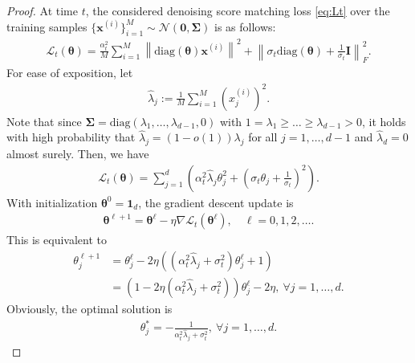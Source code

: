 \documentclass{article}
\theoremstyle{plain}
\theoremstyle{definition}
\theoremstyle{remark}
\begin{document}
\begin{proof}
    At time $t$, the considered denoising score matching loss \eqref{eq:Lt} over the training samples $\{\bm x^{(i)}\}_{i=1}^M \sim \mathcal{N}(\bm 0, \bm \Sigma)$ is as follows:
\begin{align*}
    \mathcal{L}_t(\bm \theta)
 = \frac{\alpha_t^2}{M}\sum_{i=1}^M\left\|\mathrm{diag}(\bm \theta)\bm x^{(i)}\right\|^2 + \left\|\sigma_t\mathrm{diag}(\bm \theta) + \frac{1}{\sigma_t}\bm{I} \right\|_F^2.
\end{align*}
For ease of exposition, let
\begin{align}
    \hat{\lambda}_j := \frac{1}{M}\sum_{i=1}^M \left( x_{j}^{(i)}\right)^2.
\end{align}
Note that since $\bm \Sigma = \mathrm{diag}(\lambda_1,\dots,\lambda_{d-1},0)$ with $1 = \lambda_1 \ge \dots \ge \lambda_{d-1} > 0$, it holds with high probability that $\hat{\lambda}_j = \left(1 - o(1)\right)\lambda_j$ for all $j=1,\dots,d-1$ and $\hat{\lambda}_d = 0$ almost surely.
Then, we have
\begin{align*}
      \mathcal{L}_t(\bm \theta) = \sum_{j=1}^d \left( \alpha_t^2 \hat{\lambda}_j \theta_j^2 + \left( \sigma_t  \theta_j + \frac{1}{\sigma_t} \right)^2 \right).
\end{align*}
With initialization $\bm \theta^0 = \bm 1_d$, the gradient descent update is
\begin{align*}
\bm \theta^{\ell+1} = \bm \theta^\ell - \eta \nabla \mathcal{L}_t(\bm \theta^\ell),\quad \ell = 0,1,2,\dots.
\end{align*}
This is equivalent to
\begin{align*}
 \theta_j^{\ell+1} & = \theta_j^{\ell} - 2\eta\left( \left(\alpha_t^2\hat{\lambda}_j + \sigma_t^2\right)\theta_j^\ell + 1 \right)\\
 & = \left( 1 - 2\eta\left( \alpha_t^2 \hat{\lambda}_j + \sigma_t^2 \right) \right) \theta_j^\ell - 2\eta,\ \forall j = 1,\dots,d.
\end{align*}
Obviously, the optimal solution is
\begin{align*}
     \theta_j^* = - \frac{1}{\alpha_t^2\hat{\lambda}_j  + \sigma_t^2},\ \forall j = 1,\dots,d.

\end{align*}
\end{proof}
\end{document}
